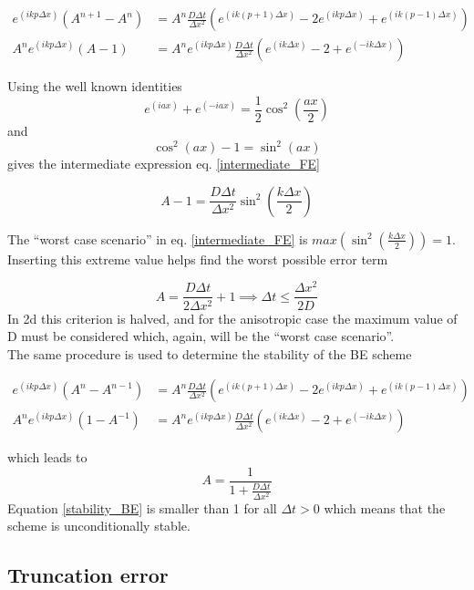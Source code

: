 \begin{align*}
 e^{(ikp\Delta x)}\left(A^{n+1}-A^n\right) &=  A^n\frac{D\Delta t}{\Delta x^2}\left(e^{(ik(p+1)\Delta x)}-2e^{(ikp\Delta x)} +e^{(ik(p-1)\Delta x)}\right)\\
  A^ne^{(ikp\Delta x)}\left(A-1\right) &=   A^ne^{(ikp\Delta x)}\frac{D\Delta t}{\Delta x^2}\left(e^{(ik\Delta x)} -2  + e^{(-ik\Delta x)}\right)
  \end{align*}
  
Using the well known identities
$$e^{(iax)}+e^{(-iax)} = \frac{1}{2}\cos^2\left(\frac{ax}{2}\right)$$
and 
$$\cos^2(ax)-1 = \sin^2(ax)$$
gives the intermediate expression eq. \eqref{intermediate_FE}

\begin{equation}\label{intermediate_FE}
 A-1 = \frac{D\Delta t}{\Delta x^2}\sin^2\left(\frac{k\Delta x}{2}\right)
\end{equation}

The ``worst case scenario'' in eq. \eqref{intermediate_FE} is  $max(\sin^2\left(\frac{k\Delta x}{2}\right))= 1$. Inserting this extreme value helps find the worst possible error term

\begin{equation}
 A = \frac{D\Delta t}{2\Delta x^2}+1 \implies \Delta t\leq\frac{\Delta x^2}{2D}
\end{equation}
In 2d this criterion is halved, and for the anisotropic case the maximum value of D must be considered which, again, will be the ``worst case scenario''.\\
The same procedure is used to determine the stability of the BE scheme

\begin{align*}
 e^{(ikp\Delta x)}\left(A^{n}-A^{n-1}\right) &=  A^n\frac{D\Delta t}{\Delta x^2}\left(e^{(ik(p+1)\Delta x)}-2e^{(ikp\Delta x)} +e^{(ik(p-1)\Delta x)}\right)\\
  A^n e^{(ikp\Delta x)}\left(1-A^{-1}\right) &=  A^n e^{(ikp\Delta x)}\frac{D\Delta t}{\Delta x^2}\left(e^{(ik\Delta x)} -2 + e^{(-ik\Delta x)}\right)
\end{align*}

which leads to 
\begin{equation}\label{stability_BE}
A = \frac{1}{ 1+\frac{D\Delta t}{\Delta x^2}}
\end{equation}
Equation \eqref{stability_BE} is smaller than 1 for all $\Delta t>0$ which means that the scheme is unconditionally stable.

\subsection{Truncation error}\label{truncation_error}

